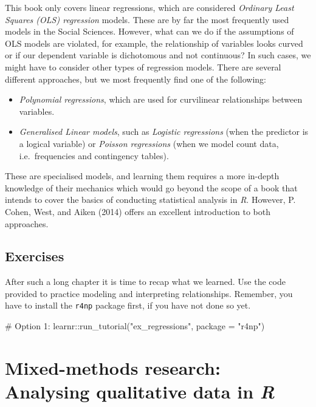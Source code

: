 \documentclass[
  letterpaper,
  DIV=11,
  numbers=noendperiod]{scrreprt}
\newenvironment{Shaded}{\begin{snugshade}}{\end{snugshade}}
\newcommand{\AttributeTok}[1]{\textcolor[rgb]{0.40,0.45,0.13}{#1}}
\newcommand{\CommentTok}[1]{\textcolor[rgb]{0.37,0.37,0.37}{#1}}
\newcommand{\FunctionTok}[1]{\textcolor[rgb]{0.28,0.35,0.67}{#1}}
\newcommand{\NormalTok}[1]{\textcolor[rgb]{0.00,0.23,0.31}{#1}}
\newcommand{\SpecialCharTok}[1]{\textcolor[rgb]{0.37,0.37,0.37}{#1}}
\newcommand{\StringTok}[1]{\textcolor[rgb]{0.13,0.47,0.30}{#1}}
\begin{document}
This book only covers linear regressions, which are considered
\emph{Ordinary Least Squares (OLS) regression} models. These are by far
the most frequently used models in the Social Sciences. However, what
can we do if the assumptions of OLS models are violated, for example,
the relationship of variables looks curved or if our dependent variable
is dichotomous and not continuous? In such cases, we might have to
consider other types of regression models. There are several different
approaches, but we most frequently find one of the following:

\begin{itemize}
\item
  \emph{Polynomial regressions}, which are used for curvilinear
  relationships between variables.
\item
  \emph{Generalised Linear models}, such as \emph{Logistic regressions}
  (when the predictor is a logical variable) or \emph{Poisson
  regressions} (when we model count data, i.e.~frequencies and
  contingency tables).
\end{itemize}

These are specialised models, and learning them requires a more in-depth
knowledge of their mechanics which would go beyond the scope of a book
that intends to cover the basics of conducting statistical analysis in
\emph{R}. However, P. Cohen, West, and Aiken (2014) offers an excellent
introduction to both approaches.

\section{Exercises}\label{sec-exercises-regressions}

After such a long chapter it is time to recap what we learned. Use the
code provided to practice modeling and interpreting relationships.
Remember, you have to install the \texttt{r4np} package first, if you
have not done so yet.

\begin{Shaded}
\begin{Highlighting}[]
\CommentTok{\# Option 1:}
\NormalTok{learnr}\SpecialCharTok{::}\FunctionTok{run\_tutorial}\NormalTok{(}\StringTok{"ex\_regressions"}\NormalTok{, }\AttributeTok{package =} \StringTok{"r4np"}\NormalTok{)}
\end{Highlighting}
\end{Shaded}


\chapter{\texorpdfstring{Mixed-methods research: Analysing qualitative
data in
\emph{R}}{Mixed-methods research: Analysing qualitative data in R}}\label{sec-mixed-methods-research}
\end{document}
